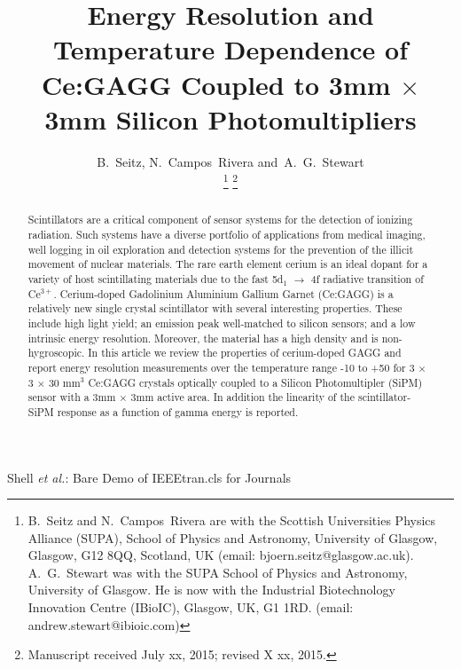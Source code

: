 \documentclass[journal]{IEEEtran}
\begin{document}
\title{Energy Resolution and Temperature Dependence of Ce:GAGG Coupled to 3mm $\times$ 3mm Silicon Photomultipliers}

\author{B.~Seitz, 
	N.~Campos~Rivera
	and~A.~G.~Stewart%

\thanks{B.~Seitz and N.~Campos~Rivera are with the Scottish Universities Physics Alliance (SUPA), School of Physics and Astronomy, University of Glasgow, Glasgow, G12 8QQ, Scotland, UK (email: bjoern.seitz@glasgow.ac.uk). \mbox{A. G. Stewart} was with the SUPA School of Physics and Astronomy, University of Glasgow. He is now with the Industrial Biotechnology Innovation Centre (IBioIC), Glasgow, UK, G1 1RD. (email: andrew.stewart@ibioic.com)}%
\thanks{Manuscript received July xx, 2015; revised X xx, 2015.}}

%
{Shell \MakeLowercase{\textit{et al.}}: Bare Demo of IEEEtran.cls for Journals}

\maketitle

\begin{abstract}
Scintillators are a critical component of sensor systems for the detection of ionizing radiation. Such systems have a diverse portfolio of applications from medical imaging, well logging in oil exploration and detection systems for the prevention of the illicit movement of nuclear materials. The rare earth element cerium is an ideal dopant for a variety of host scintillating materials due to the fast 5d$_{1}$ $\rightarrow$ 4f radiative transition of Ce$^{3+}$. Cerium-doped Gadolinium Aluminium Gallium Garnet (Ce:GAGG) is a relatively new single crystal scintillator with several interesting properties. These include high light yield; an emission peak well-matched to silicon sensors; and a low intrinsic energy resolution. Moreover, the material has a high density and is non-hygroscopic. In this article we review the properties of cerium-doped GAGG and report energy resolution measurements over the temperature range -10\celsius{} to +50\celsius{} for 3 $\times$ 3 $\times$ 30 mm$^{3}$ Ce:GAGG crystals optically coupled to a Silicon Photomultipler (SiPM) sensor with a 3mm $\times$ 3mm active area. In addition the linearity of the scintillator-SiPM response as a function of gamma energy is reported. 
\end{abstract}
\end{document}
